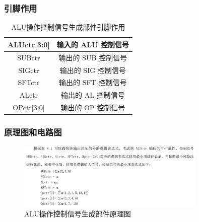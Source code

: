 \documentclass{article}
\begin{document}
    \subsubsection{引脚作用}
    \begin{table}[H]
    \centering
    \begin{tabular}{|c|c|}
        \hline
        ALUctr[3:0]   & 输入的 ALU 控制信号 \\ \hline
        SUBctr & 输出的 SUB 控制信号 \\ \hline
        SIGctr   & 输出的 SIG 控制信号 \\ \hline
        SFTctr   & 输出的 SFT 控制信号 \\ \hline
        ALctr  & 输出的 AL 控制信号 \\ \hline
        OPctr[3:0]  & 输出的 OP 控制信号 \\ \hline
    \end{tabular}
    \caption{ALU操作控制信号生成部件引脚作用}
    \end{table}

    \subsubsection{原理图和电路图}
    \begin{figure}[H]
    \centering
    \includegraphics[width=0.8\textwidth]{5.4.1.png}
    \caption{ALU操作控制信号生成部件原理图}
    \end{figure}
\end{document}
